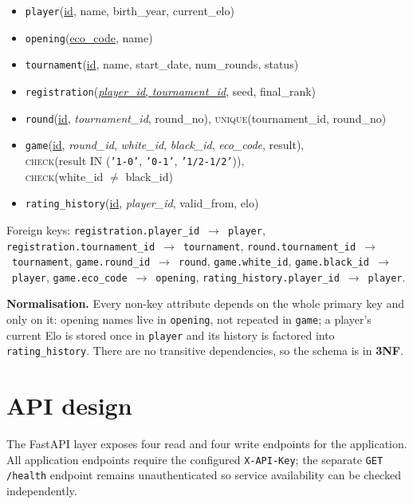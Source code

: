 \documentclass[11pt,a4paper]{article}
\begin{document}
\begin{itemize}
  \item \texttt{player}(\underline{id}, name, birth\_year, current\_elo)
  \item \texttt{opening}(\underline{eco\_code}, name)
  \item \texttt{tournament}(\underline{id}, name, start\_date, num\_rounds, status)
  \item \texttt{registration}(\underline{\emph{player\_id}, \emph{tournament\_id}}, seed, final\_rank)
  \item \texttt{round}(\underline{id}, \emph{tournament\_id}, round\_no),
        \textsc{unique}(tournament\_id, round\_no)
  \item \texttt{game}(\underline{id}, \emph{round\_id}, \emph{white\_id}, \emph{black\_id},
        \emph{eco\_code}, result), \\
        \hspace*{1em}\textsc{check}(result IN (\texttt{'1-0'}, \texttt{'0-1'}, \texttt{'1/2-1/2'})), \\
        \hspace*{1em}\textsc{check}(white\_id $\neq$ black\_id)
  \item \texttt{rating\_history}(\underline{id}, \emph{player\_id}, valid\_from, elo)
\end{itemize}

Foreign keys: \texttt{registration.player\_id}~$\to$~\texttt{player},
\texttt{registration.tournament\_id}~$\to$~\texttt{tournament},
\texttt{round.tournament\_id}~$\to$~\texttt{tournament},
\texttt{game.round\_id}~$\to$~\texttt{round},
\texttt{game.white\_id}, \texttt{game.black\_id}~$\to$~\texttt{player},
\texttt{game.eco\_code}~$\to$~\texttt{opening},
\texttt{rating\_history.player\_id}~$\to$~\texttt{player}.

\textbf{Normalisation.} Every non-key attribute depends on the whole primary key
and only on it: opening names live in \texttt{opening}, not repeated in
\texttt{game}; a player's current Elo is stored once in \texttt{player} and its
history is factored into \texttt{rating\_history}. There are no transitive
dependencies, so the schema is in \textbf{3NF}.

\section{API design}
The FastAPI layer exposes four read and four write endpoints for the application.
All application endpoints require the configured \texttt{X-API-Key}; the
separate \texttt{GET /health} endpoint remains unauthenticated so service
availability can be checked independently.
\end{document}
